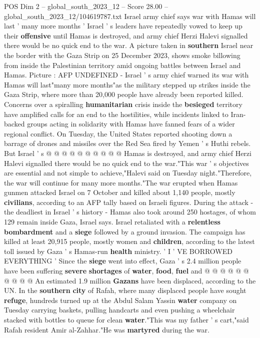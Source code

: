 \begin{textsample}{POS Dim 2 – global\_south\_2023\_12 – Score 28.00 – global\_south\_2023\_12/104619787.txt}  \label{ex:f2_pos_030}
Israel army chief says war with Hamas will last ' many more months ' Israel ' s leaders have repeatedly vowed to keep up their \textbf{offensive} until Hamas is destroyed, and army chief Herzi Halevi signalled there would be no quick end to the war.
A picture taken in \textbf{southern} Israel near the border with the Gaza Strip on 25 December 2023, shows smoke billowing from inside the Palestinian territory amid ongoing battles between Israel and Hamas.
Picture : AFP UNDEFINED - Israel ' s army chief warned its war with Hamas will last"many more months"as the military stepped up strikes inside the Gaza Strip, where more than 20,000 people have already been reported killed.
Concerns over a spiralling \textbf{humanitarian} crisis inside the \textbf{besieged} territory have amplified calls for an end to the hostilities, while incidents linked to Iran-backed groups acting in solidarity with Hamas have fanned fears of a wider regional conflict.
On Tuesday, the United States reported shooting down a barrage of drones and missiles over the Red Sea fired by Yemen ' s Huthi rebels.
But Israel ' s @ @ @ @ @ @ @ @ @ @ Hamas is destroyed, and army chief Herzi Halevi signalled there would be no quick end to the war."This war ' s objectives are essential and not simple to achieve,"Halevi said on Tuesday night."Therefore, the war will continue for many more months."The war erupted when Hamas gunmen attacked Israel on 7 October and killed about 1,140 people, mostly \textbf{civilians}, according to an AFP tally based on Israeli figures.
During the attack - the deadliest in Israel ' s history - Hamas also took around 250 hostages, of whom 129 remain inside Gaza, Israel says.
Israel retaliated with a \textbf{relentless} \textbf{bombardment} and a \textbf{siege} followed by a ground invasion.
The campaign has killed at least 20,915 people, mostly women and \textbf{children}, according to the latest toll issued by Gaza ' s Hamas-run \textbf{health} ministry. ' I ' VE BORROWED EVERYTHING ' Since the \textbf{siege} went into effect, Gaza ' s 2.4 million people have been suffering \textbf{severe} \textbf{shortages} of \textbf{water}, \textbf{food}, \textbf{fuel} and @ @ @ @ @ @ @ @ @ @ An estimated 1.9 million \textbf{Gazans} have been displaced, according to the UN.
In the \textbf{southern} \textbf{city} of Rafah, where many displaced people have sought \textbf{refuge}, hundreds turned up at the Abdul Salam Yassin \textbf{water} company on Tuesday carrying baskets, pulling handcarts and even pushing a wheelchair stacked with bottles to queue for clean \textbf{water}."This was my father ' s cart,"said Rafah resident Amir al-Zahhar."He was \textbf{martyred} during the war.

\end{textsample}
